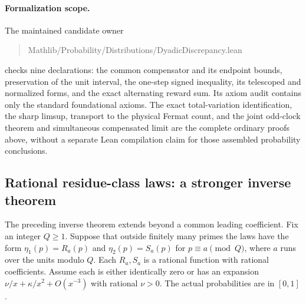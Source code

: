 \documentclass[11pt]{article}
\theoremstyle{definition}
\begin{document}
\paragraph{Formalization scope.}
The maintained candidate owner
\begin{quote}\footnotesize\ttfamily
Mathlib/Probability/Distributions/DyadicDiscrepancy.lean
\end{quote}
checks nine declarations: the common compensator and its endpoint
bounds, preservation of the unit interval, the one-step signed
inequality, its telescoped and normalized forms, and the exact
alternating reward sum.  Its axiom audit contains only the standard
foundational axioms.  The exact total-variation identification,
the sharp limsup, transport to the physical Fermat count, and the
joint odd-clock theorem and simultaneous compensated limit are the
complete ordinary proofs above, without a separate Lean compilation
claim for those assembled
probability conclusions.

\subsection{Rational residue-class laws: a stronger inverse theorem}

The preceding inverse theorem extends beyond a common leading coefficient.
Fix an integer $Q\ge1$. Suppose that outside finitely many primes the laws
have the form $\eta_1(p)=R_a(p)$ and $\eta_2(p)=S_a(p)$ for
$p\equiv a\pmod Q$, where $a$ runs over the units modulo $Q$.
Each $R_a,S_a$ is a rational function with rational coefficients.
Assume each is either identically zero or has an expansion
$\nu/x+\kappa/x^2+O(x^{-3})$ with rational $\nu>0$.
The actual probabilities are in $[0,1]$.
\end{document}
